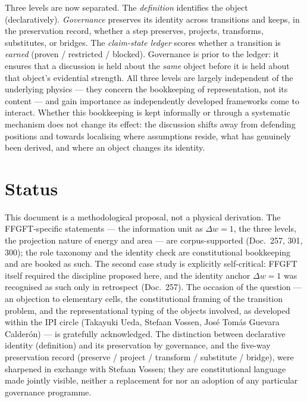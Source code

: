 Three levels are now separated. The \emph{definition} identifies the object
(declaratively). \emph{Governance} preserves its identity across transitions and keeps, in
the preservation record, whether a step preserves, projects, transforms, substitutes, or
bridges. The \emph{claim-state ledger} scores whether a transition is \emph{earned}
(proven / restricted / blocked). Governance is prior to the ledger: it ensures that a
discussion is held about the \emph{same} object before it is held about that object's
evidential strength. All three levels are largely independent of the underlying physics
--- they concern the bookkeeping of representation, not its content --- and gain importance
as independently developed frameworks come to interact. Whether this bookkeeping is kept
informally or through a systematic mechanism does not change its effect: the discussion
shifts away from defending positions and towards localising where assumptions reside, what
has genuinely been derived, and where an object changes its identity.

\section{Status}

This document is a methodological proposal, not a physical derivation. The FFGFT-specific
statements --- the information unit as $\Delta w = 1$, the three levels, the projection
nature of energy and area --- are corpus-supported (Doc.~257, 301, 300); the role taxonomy
and the identity check are constitutional bookkeeping and are booked as such. The second
case study is explicitly self-critical: FFGFT itself required the discipline proposed
here, and the identity anchor $\Delta w = 1$ was recognised as such only in retrospect
(Doc.~257). The occasion of the question --- an objection to elementary cells, the
constitutional framing of the transition problem, and the representational typing of the
objects involved, as developed within the IPI circle (Takayuki Ueda, Stefaan Vossen,
José Tomás Guevara Calderón) --- is gratefully acknowledged. The distinction between
declarative identity (definition) and its preservation by governance, and the five-way
preservation record (preserve / project / transform / substitute / bridge), were sharpened
in exchange with Stefaan Vossen; they are constitutional language made jointly visible,
neither a replacement for nor an adoption of any particular governance programme.
